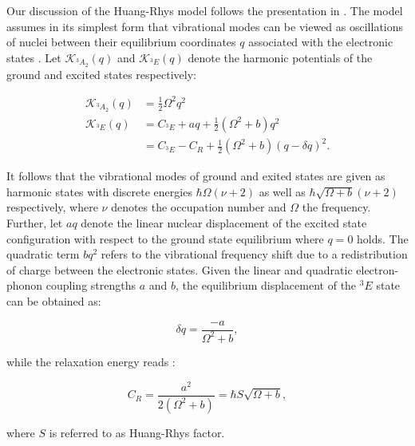     Our discussion of the Huang-Rhys model follows the presentation in \cite{doherty2013nitrogen}. The model assumes in its simplest form that vibrational modes can be viewed as oscillations of nuclei between their equilibrium coordinates $q$ associated with the electronic states \cite{Riedrich-moller2014}. Let $\mathcal{K}_{{}^{3}A_{2}}(q)$ and $\mathcal{K}_{{}^{3}E}(q)$ denote the harmonic potentials of the ground and excited states respectively:

    \begin{align}
      \mathcal{K}_{{}^{3}A_{2}}(q) & = \frac{1}{2} \Omega^2 q^2 \\
      \mathcal{K}_{{}^{3}E}(q) & = C_{{}^{3}E} + aq + \frac{1}{2} (\Omega^2 + b)q^2 \\
       & = C_{{}^{3}E} - C_R + \frac{1}{2} (\Omega^2 + b)(q - \delta q)^2.
    \end{align}

    It follows that the vibrational modes of ground and exited states are given as harmonic states with discrete energies $\hbar \Omega (\nu + 2)$ as well as $\hbar \sqrt{\Omega + b} (\nu + 2)$ respectively, where $\nu$ denotes the occupation number and $\Omega$ the frequency.
    Further, let $aq$ denote the linear nuclear displacement of the excited state configuration with respect to the ground state equilibrium where $q = 0$ holds.
    The quadratic term $bq^2$ refers to the vibrational frequency shift due to a redistribution of charge between the electronic states.
    Given the linear and quadratic electron-phonon coupling strengths $a$ and $b$, the equilibrium displacement of the ${}^{3}E$ state can be obtained as:

    \begin{equation}
      \delta q = \frac{-a}{\Omega^2 + b },
    \end{equation}

    while the relaxation energy reads \cite{doherty2013nitrogen}:

    \begin{equation}
      C_R = \frac{a^2}{2 (\Omega^2 + b)} = \hbar S \sqrt{\Omega + b},
    \end{equation}


   where $S$ is referred to as Huang-Rhys factor.

